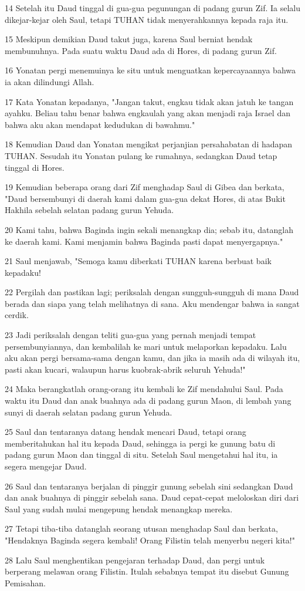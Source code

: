 \par 14 Setelah itu Daud tinggal di gua-gua pegunungan di padang gurun Zif. Ia selalu dikejar-kejar oleh Saul, tetapi TUHAN tidak menyerahkannya kepada raja itu.
\par 15 Meskipun demikian Daud takut juga, karena Saul berniat hendak membunuhnya. Pada suatu waktu Daud ada di Hores, di padang gurun Zif.
\par 16 Yonatan pergi menemuinya ke situ untuk menguatkan kepercayaannya bahwa ia akan dilindungi Allah.
\par 17 Kata Yonatan kepadanya, "Jangan takut, engkau tidak akan jatuh ke tangan ayahku. Beliau tahu benar bahwa engkaulah yang akan menjadi raja Israel dan bahwa aku akan mendapat kedudukan di bawahmu."
\par 18 Kemudian Daud dan Yonatan mengikat perjanjian persahabatan di hadapan TUHAN. Sesudah itu Yonatan pulang ke rumahnya, sedangkan Daud tetap tinggal di Hores.
\par 19 Kemudian beberapa orang dari Zif menghadap Saul di Gibea dan berkata, "Daud bersembunyi di daerah kami dalam gua-gua dekat Hores, di atas Bukit Hakhila sebelah selatan padang gurun Yehuda.
\par 20 Kami tahu, bahwa Baginda ingin sekali menangkap dia; sebab itu, datanglah ke daerah kami. Kami menjamin bahwa Baginda pasti dapat menyergapnya."
\par 21 Saul menjawab, "Semoga kamu diberkati TUHAN karena berbuat baik kepadaku!
\par 22 Pergilah dan pastikan lagi; periksalah dengan sungguh-sungguh di mana Daud berada dan siapa yang telah melihatnya di sana. Aku mendengar bahwa ia sangat cerdik.
\par 23 Jadi periksalah dengan teliti gua-gua yang pernah menjadi tempat persembunyiannya, dan kembalilah ke mari untuk melaporkan kepadaku. Lalu aku akan pergi bersama-sama dengan kamu, dan jika ia masih ada di wilayah itu, pasti akan kucari, walaupun harus kuobrak-abrik seluruh Yehuda!"
\par 24 Maka berangkatlah orang-orang itu kembali ke Zif mendahului Saul. Pada waktu itu Daud dan anak buahnya ada di padang gurun Maon, di lembah yang sunyi di daerah selatan padang gurun Yehuda.
\par 25 Saul dan tentaranya datang hendak mencari Daud, tetapi orang memberitahukan hal itu kepada Daud, sehingga ia pergi ke gunung batu di padang gurun Maon dan tinggal di situ. Setelah Saul mengetahui hal itu, ia segera mengejar Daud.
\par 26 Saul dan tentaranya berjalan di pinggir gunung sebelah sini sedangkan Daud dan anak buahnya di pinggir sebelah sana. Daud cepat-cepat meloloskan diri dari Saul yang sudah mulai mengepung hendak menangkap mereka.
\par 27 Tetapi tiba-tiba datanglah seorang utusan menghadap Saul dan berkata, "Hendaknya Baginda segera kembali! Orang Filistin telah menyerbu negeri kita!"
\par 28 Lalu Saul menghentikan pengejaran terhadap Daud, dan pergi untuk berperang melawan orang Filistin. Itulah sebabnya tempat itu disebut Gunung Pemisahan.

